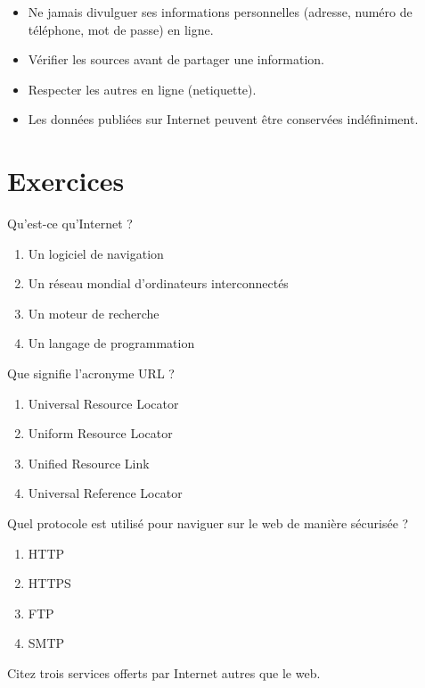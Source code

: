 \begin{aretenir}
\begin{itemize}
    \item Ne jamais divulguer ses informations personnelles (adresse, numéro de téléphone, mot de passe) en ligne.
    \item Vérifier les sources avant de partager une information.
    \item Respecter les autres en ligne (netiquette).
    \item Les données publiées sur Internet peuvent être conservées indéfiniment.
\end{itemize}
\end{aretenir}

\section{Exercices}


\exo{}
Qu'est-ce qu'Internet ?
\begin{enumerate}
    \item Un logiciel de navigation
    \item Un réseau mondial d'ordinateurs interconnectés
    \item Un moteur de recherche
    \item Un langage de programmation
\end{enumerate}

\exo{}
Que signifie l'acronyme URL ?
\begin{enumerate}
    \item Universal Resource Locator
    \item Uniform Resource Locator
    \item Unified Resource Link
    \item Universal Reference Locator
\end{enumerate}

\exo{}
Quel protocole est utilisé pour naviguer sur le web de manière sécurisée ?
\begin{enumerate}
    \item HTTP
    \item HTTPS
    \item FTP
    \item SMTP
\end{enumerate}

\exo{}
Citez trois services offerts par Internet autres que le web.

